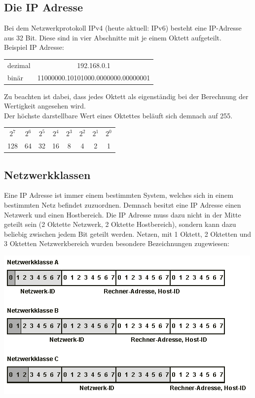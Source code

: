 \documentclass[12pt,a4paper]{article}
\begin{document}
		\subsection{Die IP Adresse}
			Bei dem Netzwerkprotokoll IPv4 (heute aktuell: IPv6) besteht eine IP-Adresse aus 32 Bit. Diese sind in vier Abschnitte mit je einem Oktett aufgeteilt.\\
			Beispiel IP Adresse:
			\begin{center}
				\renewcommand{\arraystretch}{1.5}
				\begin{tabularx}{10cm}{lc}
					dezimal&192.168.0.1 \\
					binär&11000000.10101000.0000000.00000001 \\
				\end{tabularx}
			\end{center}
			Zu beachten ist dabei, dass jedes Oktett als eigenständig bei der Berechnung der Wertigkeit angesehen wird.\\ Der höchste darstellbare Wert eines Oktettes beläuft sich demnach auf 255.
			\begin{center}
				\renewcommand{\arraystretch}{1.5}
				\begin{tabularx}{6cm}{cccccccc}
					$2^7$&$2^6$&$2^5$&$2^4$&$2^3$&$2^2$&$2^1$&$2^0$ \\
					128&64&32&16&8&4&2&1 \\
				\end{tabularx}
			\end{center}
		
		\subsection{Netzwerkklassen}
			Eine IP Adresse ist immer einem bestimmten System, welches sich in einem bestimmten Netz befindet zuzuordnen. Demnach besitzt eine IP Adresse einen Netzwerk und einen Hostbereich. Die IP Adresse muss dazu nicht in der Mitte geteilt sein (2 Oktette Netzwerk, 2 Oktette Hostbereich), sondern kann dazu beliebig zwischen jedem Bit geteilt werden. Netzen, mit 1 Oktett, 2 Oktetten und 3 Oktetten Netzwerkbereich wurden besondere Bezeichnungen zugewiesen:
			\begin{center}
				\includegraphics[scale=0.7]{Bilder/Netzwerkklassen.png}
			\end{center}
		
\end{document}
